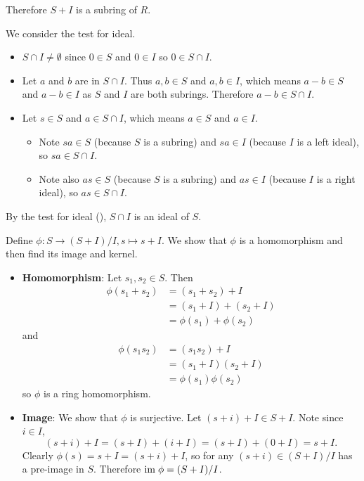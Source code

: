 \begin{questions}
\begin{partquestions}{\roman*}
        Therefore $S+I$ is a subring of $R$.

        \item We consider the test for ideal.
        \begin{itemize}
            \item $S \cap I \neq \emptyset$ since $0 \in S$ and $0 \in I$ so $0 \in S \cap I$.
            \item Let $a$ and $b$ are in $S \cap I$. Thus $a, b \in S$ and $a, b \in I$, which means $a - b \in S$ and $a - b \in I$ as $S$ and $I$ are both subrings. Therefore $a - b \in S \cap I$.
            \item Let $s \in S$ and $a \in S \cap I$, which means $a \in S$ and $a \in I$.
            \begin{itemize}
                \item Note $sa \in S$ (because $S$ is a subring) and $sa \in I$ (because $I$ is a left ideal), so $sa \in S \cap I$.
                \item Note also $as \in S$ (because $S$ is a subring) and $as \in I$ (because $I$ is a right ideal), so $as \in S \cap I$.
            \end{itemize}
        \end{itemize}
        By the test for ideal (), $S \cap I$ is an ideal of $S$.

        \item Define $\phi: S \to (S+I)/I, s \mapsto s+I$. We show that $\phi$ is a homomorphism and then find its image and kernel.
        \begin{itemize}
            \item \textbf{Homomorphism}: Let $s_1, s_2 \in S$. Then
            \begin{align*}
                \phi(s_1 + s_2) &= (s_1 + s_2) + I\\
                &= (s_1 + I) + (s_2 + I)\\
                &= \phi(s_1) + \phi(s_2)
            \end{align*}
            and
            \begin{align*}
                \phi(s_1s_2) &= (s_1s_2) + I\\
                &= (s_1+I)(s_2+I)\\
                &= \phi(s_1)\phi(s_2)
            \end{align*}
            so $\phi$ is a ring homomorphism.
    
            \item \textbf{Image}: We show that $\phi$ is surjective. Let $(s+i) + I \in S+I$. Note since $i \in I$,
            \[
                (s+i)+I = (s+I) + (i+I) = (s+I) + (0+I) = s+I.
            \]
            Clearly $\phi(s) = s+I = (s+i)+I$, so for any $(s+i)\in (S+I)/I$ has a pre-image in $S$. Therefore $\mathrm{im}\;\phi = (S+I)/I$.
    

\end{itemize}
\end{partquestions}
\end{questions}
